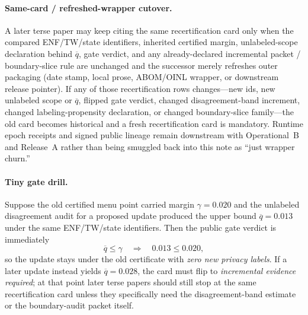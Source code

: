 \documentclass[11pt]{article}
\begin{document}
\paragraph{Same-card / refreshed-wrapper cutover.}
A later terse paper may keep citing the same recertification card only when the compared ENF/TW/state identifiers, inherited certified margin, unlabeled-scope declaration behind $\overline q$, gate verdict, and any already-declared incremental packet / boundary-slice rule are unchanged and the successor merely refreshes outer packaging (date stamp, local prose, ABOM/OINL wrapper, or downstream release pointer).
If any of those recertification rows changes---new ids, new unlabeled scope or $\overline q$, flipped gate verdict, changed disagreement-band increment, changed labeling-propensity declaration, or changed boundary-slice family---the old card becomes historical and a fresh recertification card is mandatory.
Runtime epoch receipts and signed public lineage remain downstream with Operational~B and Release~A rather than being smuggled back into this note as ``just wrapper churn.''\cite{series:operationalB,series:releaseA}

\paragraph{Tiny gate drill.}
Suppose the old certified menu point carried margin $\gamma=0.020$ and the unlabeled disagreement audit for a proposed update produced the upper bound $\overline q=0.013$ under the same ENF/TW/state identifiers.
Then the public gate verdict is immediately
\[
\overline q \le \gamma \quad\Rightarrow\quad 0.013 \le 0.020,
\]
so the update stays under the old certificate with \emph{zero new privacy labels}.
If a later update instead yields $\overline q=0.028$, the card must flip to \emph{incremental evidence required}; at that point later terse papers should still stop at the same recertification card unless they specifically need the disagreement-band estimate or the boundary-audit packet itself.
\end{document}
